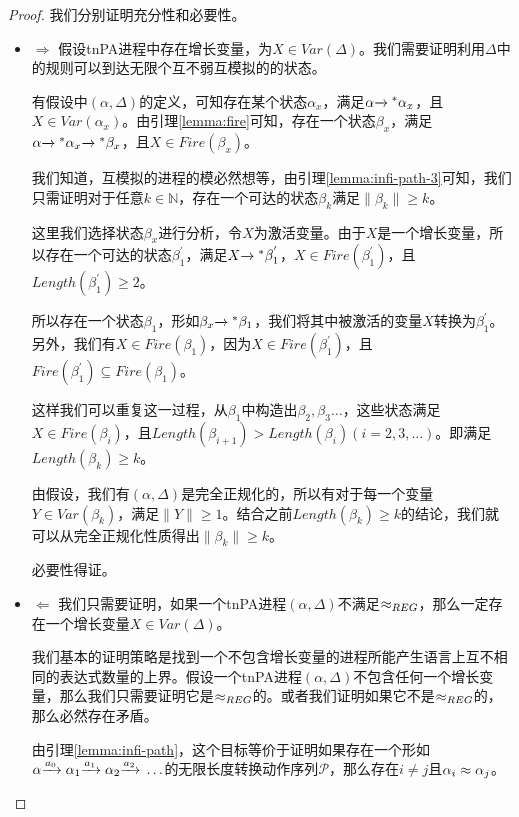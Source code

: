 \begin{proof}
我们分别证明充分性和必要性。
\begin{itemize}
	\item $\Rightarrow$ 假设tnPA进程中存在增长变量，为$X\in Var(\Delta)$。我们需要证明利用$\Delta$中的规则可以到达无限个互不弱互模拟的的状态。

有假设中$(\alpha,\Delta)$的定义，可知存在某个状态$\alpha_x$，满足$\alpha{\xrightarrow{}{}}^{*}\alpha_x$，且$X\in Var(\alpha_x)$。由引理\ref{lemma:fire}可知，存在一个状态$\beta_x$，满足$\alpha{\xrightarrow{}{}}^{*}\alpha_x{\xrightarrow{}{}}^{*}\beta_x$，且$X\in Fire(\beta_x)$。

我们知道，互模拟的进程的模必然想等，由引理\ref{lemma:infi-path-3}可知，我们只需证明对于任意$k\in \mathbb{N}$，存在一个可达的状态$\beta_k$满足$\|\beta_k\|\geq k$。

这里我们选择状态$\beta_x$进行分析，令$X$为激活变量。由于$X$是一个增长变量，所以存在一个可达的状态$\beta_1^{'}$，满足$X{\xrightarrow{}{}}^{*}\beta_1^{'}$，$X\in Fire(\beta_1^{'})$，且$Length(\beta_1^{'})\geq 2$。

所以存在一个状态$\beta_1$，形如$\beta_x{\xrightarrow{}{}}^{*}\beta_1$，我们将其中被激活的变量$X$转换为$\beta_1^{'}$。另外，我们有$X\in Fire(\beta_1)$，因为$X\in Fire(\beta_1^{'})$，且$Fire(\beta_1^{'})\subseteq Fire(\beta_1)$。

这样我们可以重复这一过程，从$\beta_1$中构造出$\beta_2,\beta_3\ldots$，这些状态满足$X\in Fire(\beta_i)$，且$Length(\beta_{i+1})>Length(\beta_i)(i=2,3,\ldots)$。即满足$Length(\beta_k)\geq k$。

由假设，我们有$(\alpha,\Delta)$是完全正规化的，所以有对于每一个变量$Y\in Var(\beta_k)$，满足$\|Y\|\geq 1$。结合之前$Length(\beta_k)\geq k$的结论，我们就可以从完全正规化性质得出$\|\beta_k\|\geq k$。

必要性得证。
	
	\item $\Leftarrow$ 我们只需要证明，如果一个tnPA进程$(\alpha,\Delta)$不满足$\approx_{REG}$，那么一定存在一个增长变量$X\in Var(\Delta)$。

我们基本的证明策略是找到一个不包含增长变量的进程所能产生语言上互不相同的表达式数量的上界。假设一个tnPA进程$(\alpha,\Delta)$不包含任何一个增长变量，那么我们只需要证明它是$\approx_{REG}$的。或者我们证明如果它不是$\approx_{REG}$的，那么必然存在矛盾。

由引理\ref{lemma:infi-path}，这个目标等价于证明如果存在一个形如$\alpha{\xrightarrow{a_0}{}}\alpha_1{\xrightarrow{a_1}{}}\alpha_2{\xrightarrow{a_2}{}}\ldots$的无限长度转换动作序列$\mathcal{P}$，那么存在$i\neq j$且$\alpha_i\approx \alpha_j$。


\end{itemize}
\end{proof}
